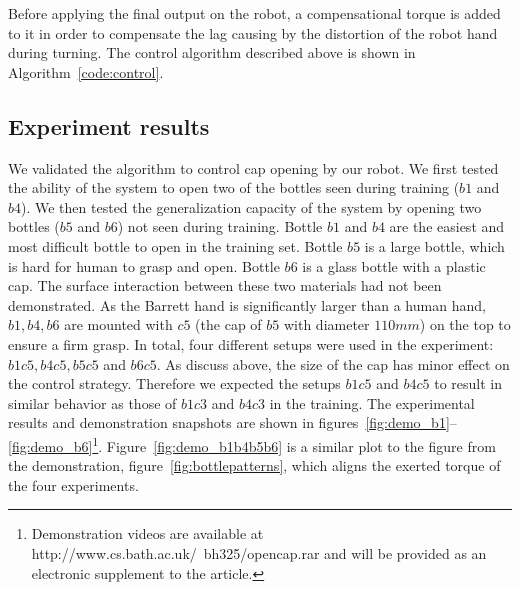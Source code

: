 
Before applying the final output on the robot, a compensational torque is added to it in order to compensate the lag causing by the distortion of the robot hand during turning. The control algorithm described above is shown in Algorithm~\ref{code:control}.


\subsection{Experiment results}



We validated the algorithm to control cap opening by our robot. We
first tested the ability of the system to open two of the bottles seen
during training ($b1$ and $b4$). We then tested the generalization
capacity of the system by opening two bottles ($b5$ and $b6$) not seen
during training.  Bottle $b1$ and $b4$ are the easiest and most difficult
bottle to open in the training set.  Bottle $b5$ is a large bottle,
which is hard for human to grasp and open. Bottle $b6$ is a glass bottle
with a plastic cap. The surface interaction between these two
materials had not been demonstrated. As the Barrett hand is
significantly larger than a human hand, $b1, b4, b6$ are mounted with
$c5$ (the cap of $b5$ with diameter $110 mm$) on the top to ensure a
firm grasp. In total, four different setups were used in the
experiment: $b1c5, b4c5, b5c5$ and $b6c5$. As discuss above, the size
of the cap has minor effect on the control strategy. Therefore we
expected the setups $b1c5$ and $b4c5$ to result in similar behavior as
those of $b1c3$ and $b4c3$ in the training. The experimental results
and demonstration snapshots are shown in
figures~\ref{fig:demo_b1}--\ref{fig:demo_b6}\footnote{Demonstration
  videos are available at http://www.cs.bath.ac.uk/~bh325/opencap.rar
  and will be provided as an electronic supplement to the
  article.}. Figure~\ref{fig:demo_b1b4b5b6} is a similar plot to the
figure from the demonstration, figure~\ref{fig:bottlepatterns}, which
aligns the exerted torque of the four experiments. %

